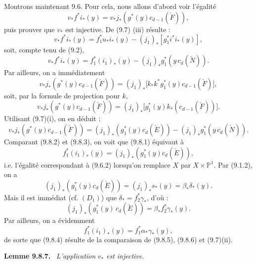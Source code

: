 \documentclass[11pt]{article}
\newenvironment{statement}[1]{\par\medskip\noindent\textbf{#1.}\ }{\par\medskip}
\begin{document}
Montrons maintenant 9.6. Pour cela, nous allons d'abord voir l'égalité
\[
v_*f^*i_*(y)=v_*j_*(g^*(y)c_{d-1}(\check F)),
\tag{9.8.1}
\]
puis prouver que $v_*$ est injective. De (9.7) (iii) résulte :
\[
v_*f^*i_*(y)=f_1^*u_*i_*(y)-(j_1)_*[g_1^*i^*i_*(y)],
\]
soit, compte tenu de (9.2),
\[
v_*f^*i_*(y)=f_1^*(i_1)_*(y)-(j_1)_*g_1^*(y\,c_d(\check N)).
\tag{9.8.2}
\]
Par ailleurs, on a immédiatement
\[
v_*j_*(g^*(y)c_{d-1}(\check F))
=(j_1)_*\bigl[k_*k^*g_1^*(y)c_{d-1}(\check F)\bigr],
\]
soit, par la formule de projection pour $k$,
\[
v_*j_*(g^*(y)c_{d-1}(\check F))
=(j_1)_*\bigl[g_1^*(y)k_*(c_{d-1}(\check F))\bigr].
\]
Utilisant (9.7)(i), on en déduit :
\[
v_*j_*(g^*(y)c_{d-1}(\check F))
=(j_1)_*(g_1^*(y)c_d(\check E))-(j_1)_*g_1^*(y\,c_d(\check N)).
\tag{9.8.3}
\]
Comparant (9.8.2) et (9.8.3), on voit que (9.8.1) équivaut à
\[
f_1^*(i_1)_*(y)=(j_1)_*(g_1^*(y)c_d(\check E)),
\tag{9.8.4}
\]
i.e. l'égalité correspondant à (9.6.2) lorsqu'on remplace $X$ par $X\times\mathbb P^1$. Par (9.1.2), on a
\[
(j_1)_*(g_1^*(y)c_d(\check E))=(j_1)_*s_*(y)=\beta_*\delta_*(y).
\]
Mais il est immédiat (cf. $(D_1)$) que $\delta_*=f_2^*\gamma_*$, d'où :
\[
(j_1)_*(g_1^*(y)\,c_d(\check E))=\beta_*f_2^*\gamma_*(y).
\tag{9.8.5}
\]
Par ailleurs, on a évidemment
\[
f_1^*(i_1)_*(y)=f_1^*\alpha_*\gamma_*(y),
\tag{9.8.6}
\]
de sorte que (9.8.4) résulte de la comparaison de (9.8.5), (9.8.6) et (9.7)(ii).

\begin{statement}{Lemme 9.8.7}
\emph{L'application} $v_*$ \emph{est injective}.
\end{statement}
\end{document}
